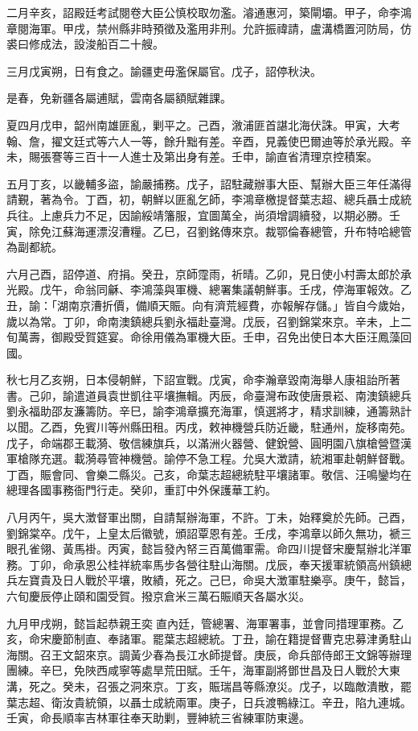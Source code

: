 \begin{pinyinscope}
二月辛亥，詔殿廷考試閱卷大臣公慎校取勿濫。濬通惠河，築閘壩。甲子，命李鴻章閱海軍。甲戌，禁州縣非時預徵及濫用非刑。允許振禕請，盧溝橋置河防局，仿裘曰修成法，設浚船百二十艘。

三月戊寅朔，日有食之。諭疆吏毋濫保屬官。戊子，詔停秋決。

是春，免新疆各屬逋賦，雲南各屬額賦雜課。

夏四月戊申，韶州南雄匪亂，剿平之。己酉，漵浦匪首諶北海伏誅。甲寅，大考翰、詹，擢文廷式等六人一等，餘升黜有差。辛酉，見義使巴爾迪等於承光殿。辛未，賜張謇等三百十一人進士及第出身有差。壬申，諭直省清理京控積案。

五月丁亥，以畿輔多盜，諭嚴捕務。戊子，詔駐藏辦事大臣、幫辦大臣三年任滿得請覲，著為令。丁酉，初，朝鮮以匪亂乞師，李鴻章檄提督葉志超、總兵聶士成統兵往。上慮兵力不足，因諭綏靖籓服，宜圖萬全，尚須增調續發，以期必勝。壬寅，除免江蘇海運漂沒漕糧。乙巳，召劉銘傳來京。裁鄂倫春總管，升布特哈總管為副都統。

六月己酉，詔停道、府捐。癸丑，京師霪雨，祈晴。乙卯，見日使小村壽太郎於承光殿。戊午，命翁同龢、李鴻藻與軍機、總署集議朝鮮事。壬戌，停海軍報效。乙丑，諭：「湖南京漕折價，備順天賑。向有濟荒經費，亦報解存儲。」皆自今歲始，歲以為常。丁卯，命南澳鎮總兵劉永福赴臺灣。戊辰，召劉錦棠來京。辛未，上二旬萬壽，御殿受賀筵宴。命徐用儀為軍機大臣。壬申，召免出使日本大臣汪鳳藻回國。

秋七月乙亥朔，日本侵朝鮮，下詔宣戰。戊寅，命李瀚章毀南海舉人康祖詒所著書。己卯，諭遣道員袁世凱往平壤撫輯。丙辰，命臺灣布政使唐景崧、南澳鎮總兵劉永福助邵友濂籌防。辛巳，諭李鴻章擴充海軍，慎選將才，精求訓練，通籌熟計以聞。乙酉，免賓川等州縣田租。丙戌，敕神機營兵防近畿，駐通州，旋移南苑。戊子，命端郡王載漪、敬信練旗兵，以滿洲火器營、健銳營、圓明園八旗槍營暨漢軍槍隊充選。載漪尋管神機營。諭停不急工程。允吳大澂請，統湘軍赴朝鮮督戰。丁酉，賑會同、會樂二縣災。己亥，命葉志超總統駐平壤諸軍。敬信、汪鳴鑾均在總理各國事務衙門行走。癸卯，重訂中外保護華工約。

八月丙午，吳大澂督軍出關，自請幫辦海軍，不許。丁未，始釋奠於先師。己酉，劉錦棠卒。戊午，上皇太后徽號，頒詔覃恩有差。壬戌，李鴻章以師久無功，褫三眼孔雀翎、黃馬褂。丙寅，懿旨發內帑三百萬備軍需。命四川提督宋慶幫辦北洋軍務。丁卯，命承恩公桂祥統率馬步各營往駐山海關。戊辰，奉天援軍統領高州鎮總兵左寶貴及日人戰於平壤，敗績，死之。己巳，命吳大澂軍駐樂亭。庚午，懿旨，六旬慶辰停止頤和園受賀。撥京倉米三萬石賑順天各屬水災。

九月甲戌朔，懿旨起恭親王奕直內廷，管總署、海軍署事，並會同措理軍務。乙亥，命宋慶節制直、奉諸軍。罷葉志超總統。丁丑，諭在籍提督曹克忠募津勇駐山海關。召王文韶來京。調黃少春為長江水師提督。庚辰，命兵部侍郎王文錦等辦理團練。辛巳，免陜西咸寧等處旱荒田賦。壬午，海軍副將鄧世昌及日人戰於大東溝，死之。癸未，召張之洞來京。丁亥，賑瑞昌等縣潦災。戊子，以臨敵潰散，罷葉志超、衛汝貴統領，以聶士成統兩軍。庚子，日兵渡鴨綠江。辛丑，陷九連城。壬寅，命長順率吉林軍往奉天助剿，豐紳統三省練軍防東邊。


\end{pinyinscope}
